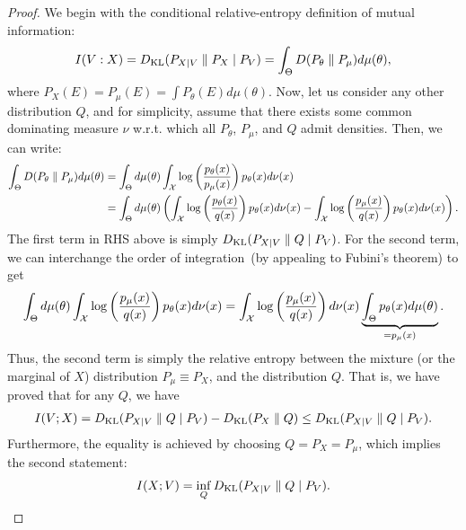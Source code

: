\documentclass[12pt]{article}
\begin{document}
\begin{proof}
	We begin with the conditional relative-entropy definition of mutual information:
	\begin{align}
	I(V: X) = D_{\text{KL}}(P_{X|V} \parallel P_X \mid P_V) = \int_{\Theta}  D(P_\theta \parallel P_\mu) d\mu(\theta), 
	\end{align}
	where $P_X(E) = P_\mu(E)  = \int P_\theta(E) d\mu(\theta)$. Now, let us consider any other distribution $Q$, and for simplicity, assume that there exists some common dominating measure $\nu$ w.r.t. which all $P_\theta$, $P_\mu$, and $Q$ admit densities. Then, we can write: 
	\begin{align}
	\int_{\Theta} D(P_\theta \parallel P_\mu) d\mu(\theta) &= \int_{\Theta} d\mu(\theta) \int_{{\cal X}} \log \left( \frac{p_\theta(x)}{p_\mu(x)} \right) p_\theta(x) d\nu(x)  \\
	&= \int_{\Theta} d\mu(\theta) \left( \int_{{\cal X}} \log \left( \frac{p_\theta(x)}{q(x)} \right) p_\theta(x) d\nu(x)  - \int_{{\cal X}} \log \left( \frac{p_\mu(x)}{q(x)}\right) p_\theta(x)d\nu(x) \right). 
	\end{align}
	The first term in RHS above is simply $D_{\text{KL}}(P_{X|V} \parallel Q \mid P_V)$. For the second term, we can interchange the order of integration~(by appealing to Fubini's theorem) to get 
	\begin{align}
	\int_{\Theta} d\mu(\theta) \int_{{\cal X}} \log \left(  \frac{p_\mu(x)}{q(x)}\right) p_\theta(x)d\nu(x) = \int_{{\cal X}}  \log \left(  \frac{p_\mu(x)}{q(x)}\right) d\nu(x) \underbrace{\int_{\Theta} p_\theta(x) d\mu(\theta)}_{= p_\mu(x)}. 
	\end{align}
	Thus, the second term is simply the relative entropy between the mixture (or the marginal of $X$) distribution $P_\mu \equiv P_X$, and the distribution $Q$. That is, we have proved that for any $Q$, we have 
	\begin{align}
		I(V; X) = D_{\text{KL}}(P_{X|V} \parallel Q \mid P_V) - D_{\text{KL}}(P_X \parallel Q) \leq D_{\text{KL}}(P_{X|V} \parallel Q \mid P_V). 
	\end{align}
	Furthermore, the equality is achieved by choosing $Q = P_X = P_\mu$, which implies the second statement: 
	\begin{align}
	I(X; V) = \inf_{Q} D_{\text{KL}}(P_{X|V} \parallel Q \mid P_V). 
	\end{align}
\end{proof}
\end{document}
